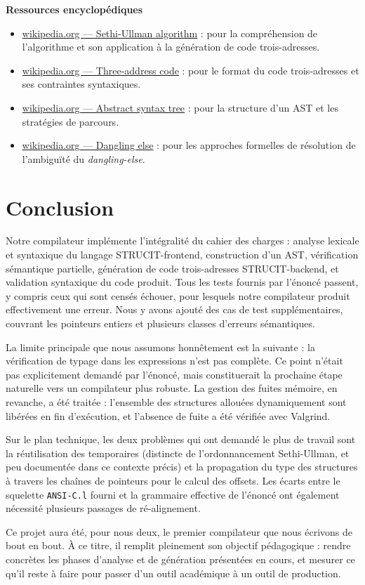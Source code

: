 \documentclass[12pt,a4paper]{article}
\begin{document}
\medskip
\textbf{Ressources encyclopédiques}
\begin{itemize}
  \item \href{https://en.wikipedia.org/wiki/Sethi-Ullman_algorithm}{wikipedia.org --- Sethi-Ullman algorithm} : pour la compréhension de l'algorithme et son application à la génération de code trois-adresses.
  \item \href{https://en.wikipedia.org/wiki/Three-address_code}{wikipedia.org --- Three-address code} : pour le format du code trois-adresses et ses contraintes syntaxiques.
  \item \href{https://en.wikipedia.org/wiki/Abstract_syntax_tree}{wikipedia.org --- Abstract syntax tree} : pour la structure d'un AST et les stratégies de parcours.
  \item \href{https://en.wikipedia.org/wiki/Dangling_else}{wikipedia.org --- Dangling else} : pour les approches formelles de résolution de l'ambiguïté du \textit{dangling-else}.
\end{itemize}

\section{Conclusion}

Notre compilateur implémente l'intégralité du cahier des charges : analyse lexicale et syntaxique du langage STRUCIT-frontend, construction d'un AST, vérification sémantique partielle, génération de code trois-adresses STRUCIT-backend, et validation syntaxique du code produit. Tous les tests fournis par l'énoncé passent, y compris ceux qui sont censés échouer, pour lesquels notre compilateur produit effectivement une erreur. Nous y avons ajouté des cas de test supplémentaires, couvrant les pointeurs entiers et plusieurs classes d'erreurs sémantiques.

La limite principale que nous assumons honnêtement est la suivante : la vérification de typage dans les expressions n'est pas complète. Ce point n'était pas explicitement demandé par l'énoncé, mais constituerait la prochaine étape naturelle vers un compilateur plus robuste. La gestion des fuites mémoire, en revanche, a été traitée : l'ensemble des structures allouées dynamiquement sont libérées en fin d'exécution, et l'absence de fuite a été vérifiée avec Valgrind.

Sur le plan technique, les deux problèmes qui ont demandé le plus de travail sont la réutilisation des temporaires (distincte de l'ordonnancement Sethi-Ullman, et peu documentée dans ce contexte précis) et la propagation du type des structures à travers les chaînes de pointeurs pour le calcul des offsets. Les écarts entre le squelette \texttt{ANSI-C.l} fourni et la grammaire effective de l'énoncé ont également nécessité plusieurs passages de ré-alignement.

Ce projet aura été, pour nous deux, le premier compilateur que nous écrivons de bout en bout. À ce titre, il remplit pleinement son objectif pédagogique : rendre concrètes les phases d'analyse et de génération présentées en cours, et mesurer ce qu'il reste à faire pour passer d'un outil académique à un outil de production.
\end{document}
